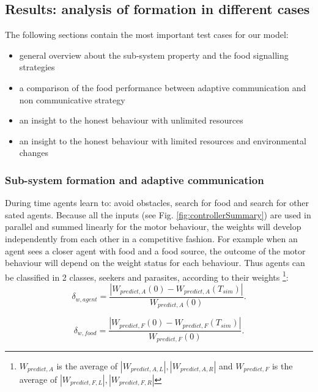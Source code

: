 \subsection{Results: analysis of formation in different cases}
The following sections contain the most important test cases for our model:
\begin{itemize}
\item general overview about the sub-system property and the food signalling strategies
\item a comparison of the food performance between adaptive communication and non communicative strategy
\item an insight to the honest behaviour with unlimited resources
\item an insight to the honest behaviour with limited resources and environmental changes
\end{itemize}

\subsubsection{Sub-system formation and adaptive communication}
During time agents learn to: avoid obstacles, search for food and search for
other sated agents.
Because all the inputs (see Fig. \ref{fig:controllerSummary}) are used in parallel
and summed linearly for the motor behaviour, the weights will develop independently
from each other in a competitive fashion.
For example when an agent sees a closer agent with food and a food source, the outcome
of the motor behaviour will depend on the weight status for each behaviour.
Thus agents can be classified in 2 classes, seekers and parasites,
according to their weights \footnote{$W_{predict,A}$ is the average
of $|W_{predict,A,L}|,|W_{predict,A,R}|$ and $W_{predict,F}$ is the average of $|W_{predict,F,L}|,|W_{predict,F,R}|$}:
\begin{equation}
\delta_{w,agent}=\frac{|W_{predict,A}(0)-W_{predict,A}(T_{sim})|}{W_{predict,A}(0)}.
\end{equation}

\begin{equation}
\delta_{w,food}=\frac{|W_{predict,F}(0)-W_{predict,F}(T_{sim})|}{W_{predict,F}(0)}.
\end{equation}


